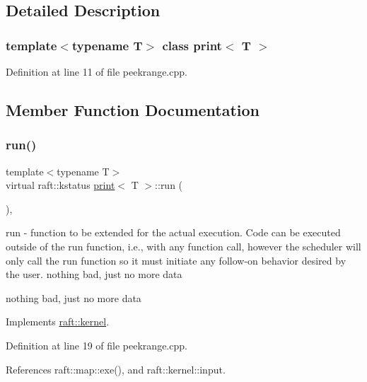 \subsection{Detailed Description}
\subsubsection*{template$<$typename T$>$\newline
class print$<$ T $>$}



Definition at line 11 of file peekrange.\+cpp.



\subsection{Member Function Documentation}
\hypertarget{classprint_aa547f61c584b4044e4a0dfc2410e5adc}{}\label{classprint_aa547f61c584b4044e4a0dfc2410e5adc} 
\subsubsection{\texorpdfstring{run()}{run()}}
{\footnotesize\ttfamily template$<$typename T$>$ \\
virtual raft\+::kstatus \hyperlink{classprint}{print}$<$ T $>$\+::run (\begin{DoxyParamCaption}{ }\end{DoxyParamCaption})\hspace{0.3cm}{\ttfamily [inline]}, {\ttfamily [virtual]}}

run -\/ function to be extended for the actual execution. Code can be executed outside of the run function, i.\+e., with any function call, however the scheduler will only call the run function so it must initiate any follow-\/on behavior desired by the user. nothing bad, just no more data

nothing bad, just no more data 

Implements \hyperlink{classraft_1_1kernel_a05094286d7577360fb1b91c91fc05901}{raft\+::kernel}.



Definition at line 19 of file peekrange.\+cpp.



References raft\+::map\+::exe(), and raft\+::kernel\+::input.


